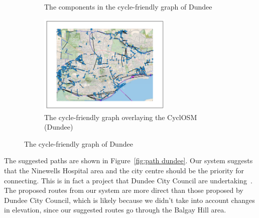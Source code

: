 \documentclass[12pt,a4paper]{report}
\begin{document}
\begin{figure}[ht!]
    \begin{subfigure}{\textwidth}
        \centering
         {
            
        }
        \caption{The components in the cycle-friendly graph of Dundee}
        \label{fig:components dundee}
    \end{subfigure}
    \hfill
    \begin{subfigure}{\textwidth}
        \centering
        \includegraphics[width=0.7\textwidth,trim={1cm 1cm 1cm 1cm},clip]{diss_images/eval/overlay_dundee.png}
        \caption{The cycle-friendly graph overlaying the CyclOSM (Dundee)}
        \label{fig:overlay dundee}
    \end{subfigure}
    \caption{The cycle-friendly graph of Dundee}
\end{figure}

The suggested paths are shown in Figure~\ref{fig:path dundee}. Our system suggests that the Ninewells Hospital area and the city centre should be the priority for connecting. This is in fact a project that Dundee City Council are undertaking~\cite{robertson:dundee}. The proposed routes from our system are more direct than those proposed by Dundee City Council, which is likely because we didn't take into account changes in elevation, since our suggested routes go through the Balgay Hill area.
\end{document}

